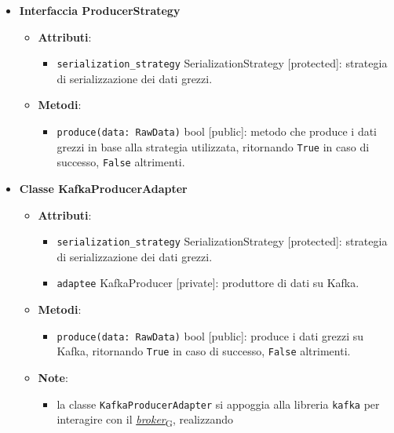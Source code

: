 \begin{itemize}
	\item \textbf{Interfaccia ProducerStrategy}
	      \begin{itemize}
		      \item \textbf{Attributi}:
		            \begin{itemize}
			            \item \texttt{serialization\_strategy} SerializationStrategy [protected]: strategia di serializzazione dei dati grezzi.
		            \end{itemize}
		      \item \textbf{Metodi}:
		            \begin{itemize}
			            \item \texttt{produce(data: RawData)} bool [public]: metodo che produce i dati grezzi in base alla strategia utilizzata, ritornando \texttt{True} in caso di successo, \texttt{False} altrimenti.
		            \end{itemize}
	      \end{itemize}
	\item \textbf{Classe KafkaProducerAdapter}
	      \begin{itemize}
		      \item \textbf{Attributi}:
		            \begin{itemize}
			            \item \texttt{serialization\_strategy} SerializationStrategy [protected]: strategia di serializzazione dei dati grezzi.
			            \item \texttt{adaptee} KafkaProducer [private]: produttore di dati su Kafka.
		            \end{itemize}
		      \item \textbf{Metodi}:
		            \begin{itemize}
			            \item \texttt{produce(data: RawData)} bool [public]: produce i dati grezzi su Kafka, ritornando \texttt{True} in caso di successo, \texttt{False} altrimenti.
		            \end{itemize}
		      \item \textbf{Note}:
		            \begin{itemize}
			            \item la classe \texttt{KafkaProducerAdapter} si appoggia alla libreria \texttt{kafka} per interagire con il \href{https://7last.github.io/docs/pb/documentazione-interna/glossario\#broker}{\textit{broker}\textsubscript{G}}, realizzando

\end{itemize}
\end{itemize}
\end{itemize}
